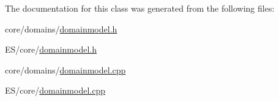 The documentation for this class was generated from the following files:\begin{DoxyCompactItemize}
\item 
core/domains/\hyperlink{core_2domains_2domainmodel_8h}{domainmodel.h}\item 
ES/core/\hyperlink{_e_s_2core_2domainmodel_8h}{domainmodel.h}\item 
core/domains/\hyperlink{core_2domains_2domainmodel_8cpp}{domainmodel.cpp}\item 
ES/core/\hyperlink{_e_s_2core_2domainmodel_8cpp}{domainmodel.cpp}\end{DoxyCompactItemize}
